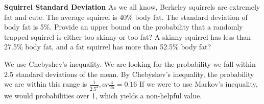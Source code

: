 \question \textbf{Squirrel Standard Deviation}\newline
As we all know, Berkeley squirrels are extremely fat and cute. 
The average squirrel is 40\% body fat. The standard deviation of body 
fat is 5\%. Provide an upper bound on the probability that a randomly 
trapped squirrel is either too skinny or too fat? A skinny squirrel 
has less than 27.5\% body fat, and a fat squirrel has more than 52.5\% 
body fat?
\begin{solution}[3cm]
We use Chebyshev's inequality. We are looking for the probability we 
fall within 2.5 standard deviations of the mean. By Chebyshev's 
inequality, the probability we are within this range is $\frac{1}{2.5^2}, or \frac{4}{25} = 0.16$
If we were to use Markov's inequality, we would probabilities over 1, 
which yields a non-helpful value.
\end{solution}   